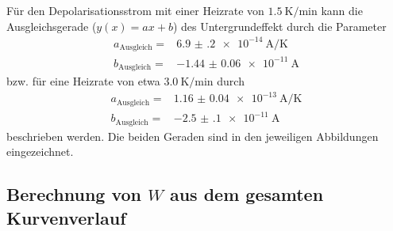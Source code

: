 Für den Depolarisationsstrom mit einer Heizrate von
$\SI{1.5}{\kelvin\per\minute}$ kann die Ausgleichsgerade
($y(x) = ax + b$)
des Untergrundeffekt durch die Parameter
\begin{align*}
  a_\text{Ausgleich} =& \SI{6.9(2)e-14}{\ampere\per\kelvin}\\
  b_\text{Ausgleich} =& \SI{-1.44(6)e-11}{\ampere}
\end{align*}
bzw. für eine Heizrate von etwa $\SI{3.0}{\kelvin\per\minute}$ durch
\begin{align*}
  a_\text{Ausgleich} =& \SI{1.16(4)e-13}{\ampere\per\kelvin} \\
  b_\text{Ausgleich} =& \SI{-2.5(1)e-11}{\ampere}
\end{align*}
beschrieben werden. Die beiden Geraden sind in den jeweiligen Abbildungen
eingezeichnet.
\subsection{Berechnung von $W$ aus dem gesamten Kurvenverlauf}

